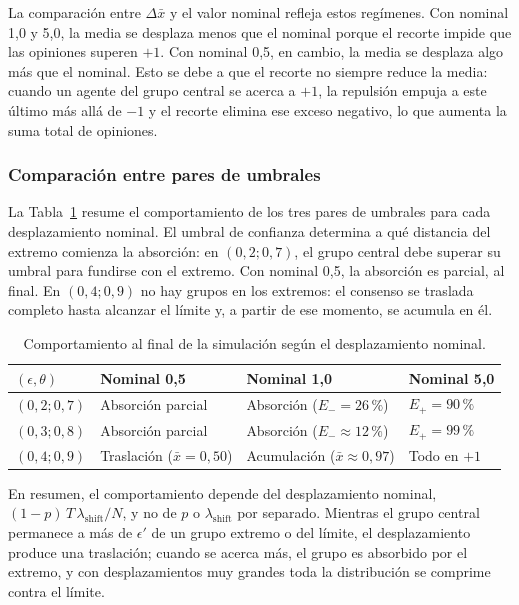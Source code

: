 \documentclass[11pt,a4paper]{article}
\begin{document}
La comparación entre $\Delta\bar{x}$ y el valor nominal refleja estos regímenes. Con nominal 1,0 y 5,0, la media se desplaza menos que el nominal porque el recorte impide que las opiniones superen $+1$. Con nominal 0,5, en cambio, la media se desplaza algo más que el nominal. Esto se debe a que el recorte no siempre reduce la media: cuando un agente del grupo central se acerca a $+1$, la repulsión empuja a este último más allá de $-1$ y el recorte elimina ese exceso negativo, lo que aumenta la suma total de opiniones.

\subsubsection{Comparación entre pares de umbrales}
\label{sec:shift-intensidad-pares}

La Tabla~\ref{tab:shift-intensidad-pares} resume el comportamiento de los tres pares de umbrales para cada desplazamiento nominal. El umbral de confianza determina a qué distancia del extremo comienza la absorción: en $(0{,}2;0{,}7)$, el grupo central debe superar su umbral para fundirse con el extremo. Con nominal 0,5, la absorción es parcial, al final. En $(0{,}4;0{,}9)$ no hay grupos en los extremos: el consenso se traslada completo hasta alcanzar el límite y, a partir de ese momento, se acumula en él.

\begin{table}[htbp]
\centering
\caption{Comportamiento al final de la simulación según el desplazamiento nominal.}
\label{tab:shift-intensidad-pares}
\small
\begin{tabular}{llll}
\toprule
$(\epsilon,\theta)$ & Nominal 0,5 & Nominal 1,0 & Nominal 5,0 \\
\midrule
$(0{,}2;0{,}7)$ & Absorción parcial & Absorción ($E_{-}=26\,\text{\%}$) & $E_{+}=90\,\text{\%}$ \\
$(0{,}3;0{,}8)$ & Absorción parcial & Absorción ($E_{-}\approx12\,\text{\%}$) & $E_{+}=99\,\text{\%}$ \\
$(0{,}4;0{,}9)$ & Traslación ($\bar{x}=0{,}50$) & Acumulación ($\bar{x}\approx0{,}97$) & Todo en $+1$ \\
\bottomrule
\end{tabular}
\end{table}

En resumen, el comportamiento depende del desplazamiento nominal, $(1-p)\,T\,\lambda_{\mathrm{shift}}/N$, y no de $p$ o $\lambda_{\mathrm{shift}}$ por separado. Mientras el grupo central permanece a más de $\epsilon'$ de un grupo extremo o del límite, el desplazamiento produce una traslación; cuando se acerca más, el grupo es absorbido por el extremo, y con desplazamientos muy grandes toda la distribución se comprime contra el límite.
\end{document}
